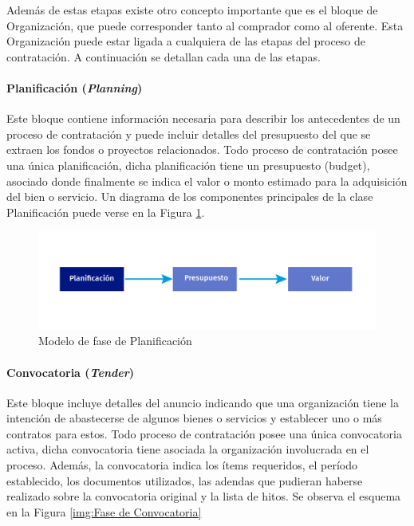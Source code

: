 Además de estas etapas existe otro concepto importante que es el bloque de Organización, que puede corresponder tanto al comprador como al oferente. Esta Organización puede estar ligada a cualquiera de las etapas del proceso de contratación. A continuación se detallan cada una de las etapas.
\paragraph{Planificación (\textit{Planning})}\hfill \break
Este bloque contiene información necesaria para describir los antecedentes de un proceso de contratación y puede incluir detalles del presupuesto del que se extraen los fondos o proyectos relacionados. Todo proceso de contratación posee una única planificación, dicha planificación tiene un presupuesto (budget), asociado donde finalmente se indica el valor o monto estimado para la adquisición del bien o servicio. Un diagrama de los componentes principales de la clase Planificación puede verse en la Figura \ref{img:Fase de Planificacion}.

\begin{figure}[htbp!]
    \centering
    \includegraphics[width=150mm]{figuras/Diagramas_Planificacion.png}
    \caption{Modelo de fase de Planificación}
    \label{img:Fase de Planificacion}
\end{figure}

\paragraph{Convocatoria (\textit{Tender})}\hfill \break
Este bloque incluye detalles del anuncio indicando que una organización tiene la intención de abastecerse de algunos bienes o servicios y establecer uno o más contratos para estos. Todo proceso de contratación posee una única convocatoria activa, dicha convocatoria tiene asociada la organización involucrada en el proceso. Además, la convocatoria indica los ítems requeridos, el período establecido, los documentos utilizados, las adendas que pudieran haberse realizado sobre la convocatoria original y la lista de hitos. Se observa el esquema en la Figura \ref{img:Fase de Convocatoria}

